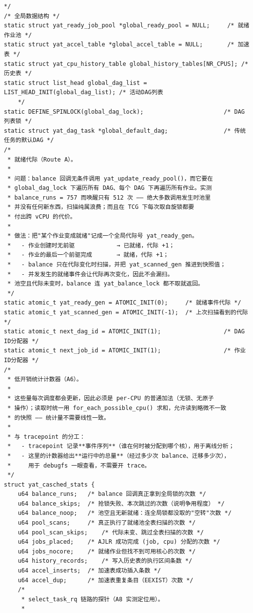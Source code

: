 \documentclass[10pt,a4paper]{article}
\newenvironment{yatpage}{\vspace*{0pt}}{\par}
\begin{document}
\newpage
\begin{yatpage}
\begin{Verbatim}[fontsize=\fontsize{8.2}{9.8}\selectfont]
 */
/* 全局数据结构 */
static struct yat_ready_job_pool *global_ready_pool = NULL;     /* 就绪作业池 */
static struct yat_accel_table *global_accel_table = NULL;       /* 加速表 */
static struct yat_cpu_history_table global_history_tables[NR_CPUS]; /* 历史表 */
static struct list_head global_dag_list = LIST_HEAD_INIT(global_dag_list); /* 活动DAG列表 
    */
static DEFINE_SPINLOCK(global_dag_lock);                       /* DAG列表锁 */
static struct yat_dag_task *global_default_dag;                /* 传统任务的默认DAG */
/*
 * 就绪代际（Route A）。
 *
 * 问题：balance 回调无条件调用 yat_update_ready_pool()，而它要在
 * global_dag_lock 下遍历所有 DAG、每个 DAG 下再遍历所有作业。实测
 * balance_runs = 757 而唤醒只有 512 次 —— 绝大多数调用发生时池里
 * 并没有任何新东西，扫描纯属浪费；而且在 TCG 下每次取自旋锁都要
 * 付出跨 vCPU 的代价。
 *
 * 做法：把"某个作业变成就绪"记成一个全局代际号 yat_ready_gen。
 *   - 作业创建时无前驱            → 已就绪，代际 +1；
 *   - 作业的最后一个前驱完成       → 就绪，代际 +1；
 *   - balance 只在代际变化时扫描，并把 yat_scanned_gen 推进到快照值；
 *   - 并发发生的就绪事件会让代际再次变化，因此不会漏扫。
 * 池空且代际未变时，balance 连 yat_balance_lock 都不取就返回。
 */
static atomic_t yat_ready_gen = ATOMIC_INIT(0);		/* 就绪事件代际 */
static atomic_t yat_scanned_gen = ATOMIC_INIT(-1);	/* 上次扫描看到的代际 */
static atomic_t next_dag_id = ATOMIC_INIT(1);                  /* DAG ID分配器 */
static atomic_t next_job_id = ATOMIC_INIT(1);                  /* 作业ID分配器 */
/*
 * 低开销统计计数器（A6）。
 *
 * 这些量每次调度都会更新，因此必须是 per-CPU 的普通加法（无锁、无原子
 * 操作）；读取时统一用 for_each_possible_cpu() 求和，允许读到略微不一致
 * 的快照 —— 统计量不需要线性一致。
 *
 * 与 tracepoint 的分工：
 *   - tracepoint 记录**事件序列**（谁在何时被分配到哪个核），用于离线分析；
 *   - 这里的计数器给出**运行中的总量**（经过多少次 balance、迁移多少次），
 *     用于 debugfs 一眼查看，不需要开 trace。
 */
struct yat_casched_stats {
	u64 balance_runs;	/* balance 回调真正拿到全局锁的次数 */
	u64 balance_skips;	/* 抢锁失败、本次跳过的次数（说明争用程度） */
	u64 balance_noop;	/* 池空且无新就绪：连全局锁都没取的"空转"次数 */
	u64 pool_scans;		/* 真正执行了就绪池全表扫描的次数 */
	u64 pool_scan_skips;	/* 代际未变、跳过全表扫描的次数 */
	u64 jobs_placed;	/* AJLR 成功完成 (job, cpu) 分配的次数 */
	u64 jobs_nocore;	/* 就绪作业但找不到可用核心的次数 */
	u64 history_records;	/* 写入历史表的执行区间条数 */
	u64 accel_inserts;	/* 加速表成功插入条数 */
	u64 accel_dup;		/* 加速表重复条目（EEXIST）次数 */
	/*
	 * select_task_rq 链路的探针（A8 实测定位用）。
	 *
\end{Verbatim}
\end{yatpage}
\end{document}
